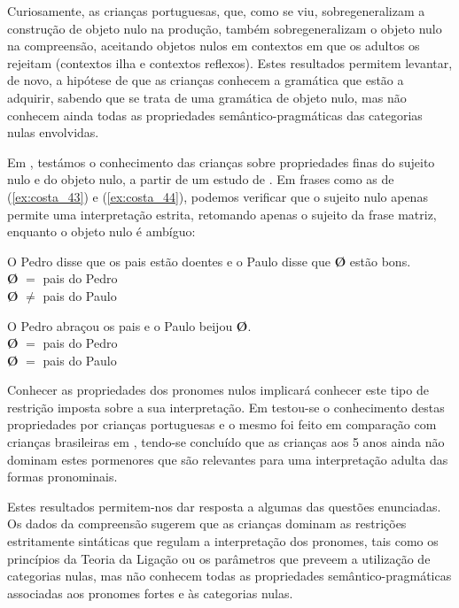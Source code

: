 \documentclass[output=paper]{LSP/langsci}
\begin{document}
Curiosamente, as crianças portuguesas, que, como se viu, sobregeneralizam a construção de objeto nulo na produção, também sobregeneralizam o objeto nulo na compreensão, aceitando objetos nulos em contextos em que os adultos os rejeitam (contextos ilha e contextos reflexos). Estes resultados permitem levantar, de novo, a hipótese de que as crianças conhecem a gramática que estão a adquirir, sabendo que se trata de uma gramática de objeto nulo, mas não conhecem ainda todas as propriedades se\-mân\-ti\-co-prag\-má\-ti\-cas das categorias nulas envolvidas.

Em \citet{costalobo2010}, testámos o conhecimento das crianças sobre propriedades finas do sujeito nulo e do objeto nulo, a partir de um estudo de \citet{miyagawa2010}. Em frases como as de (\ref{ex:costa_43}) e (\ref{ex:costa_44}), podemos verificar que o sujeito nulo apenas permite uma interpretação estrita, retomando apenas o sujeito da frase matriz, enquanto o objeto nulo é ambíguo:

\ea\label{ex:costa_43} O Pedro disse que os pais estão doentes e o Paulo disse que \textbf{Ø} estão bons.\\\textbf{Ø} $=$ pais do Pedro\\\textbf{Ø} $\neq$ pais do Paulo
\z

\ea\label{ex:costa_44} O Pedro abraçou os pais e o Paulo beijou \textbf{Ø}.\\\textbf{Ø} $=$ pais do Pedro\\\textbf{Ø} $=$ pais do Paulo
\z

Conhecer as propriedades dos pronomes nulos implicará conhecer este tipo de restrição imposta sobre a sua interpretação. Em \citet{costalobo2010} testou-se o conhecimento destas propriedades por crianças portuguesas e o mesmo foi feito em comparação com crianças brasileiras em \citet{costagrolla_etal2015}, tendo-se concluído que as crianças aos 5 anos ainda não dominam estes pormenores que são relevantes para uma interpretação adulta das formas pronominais. 

Estes resultados permitem-nos dar resposta a algumas das questões enunciadas. Os dados da compreensão sugerem que as crianças dominam as restrições estritamente sintáticas que regulam a interpretação dos pronomes, tais como os princípios da Teoria da Ligação ou os parâmetros que preveem a utilização de categorias nulas, mas não conhecem todas as propriedades se\-mân\-ti\-co-prag\-má\-ti\-cas associadas aos pronomes fortes e às categorias nulas.
\end{document}
